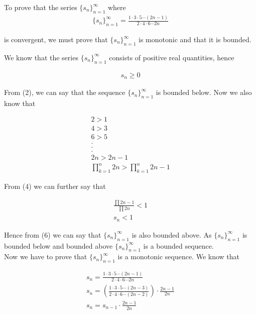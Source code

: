 \documentclass[11pt, letterpaper]{article}
\begin{document}
\begin{enumerate}
{	To prove that the series $ \lbrace s_n \rbrace_{n=1}^\infty $ where\\
	\begin{eqnarray}
		\lbrace s_n \rbrace_{n=1}^\infty  = \frac{1 \cdot 3 \cdot 5 \cdots (2n-1)}{2 \cdot 4 \cdot 6 \cdots 2n}
	\end{eqnarray} 
	
	is convergent, we must prove that $ \lbrace s_n \rbrace_{n=1}^\infty $ is monotonic and that it is bounded.
	
	We know that the series $ \lbrace s_n \rbrace_{n=1}^\infty $ consists of positive real quantities, hence
	
	\begin{eqnarray}
		s_n \geq 0
	\end{eqnarray}
	
	From (2), we can say that the sequence $ \lbrace s_n \rbrace_{n=1}^\infty $ is bounded below. Now we also know that 
	
	\begin{eqnarray}
		2 > 1 \nonumber \\
		4 > 3 \nonumber \\
		6 > 5 \nonumber \\
		. \nonumber \\
		. \nonumber \\
		. \nonumber \\
		2n > 2n - 1 \\
		\prod_{k=1}^n 2n > \prod_{k=1}^n 2n-1
	\end{eqnarray}
	
	\begin{center}
		From (4) we can further say that
	\end{center}
	
	\begin{eqnarray}
		\displaystyle {\frac{\prod 2n-1}{\prod 2n} }< 1 \\
		s_n < 1
	\end{eqnarray}
	
	Hence from (6) we can say that $ \lbrace s_n \rbrace_{n=1}^\infty $ is also bounded above. As $ \lbrace s_n \rbrace_{n=1}^\infty $ is bounded below and bounded above $ \lbrace s_n \rbrace_{n=1}^\infty $ is a bounded sequence.\\
	
	Now we have to prove that $ \lbrace s_n \rbrace_{n=1}^\infty $ is a monotonic sequence. We know that
	
	\begin{eqnarray}
		s_n = \frac{1 \cdot 3 \cdot 5 \cdots (2n-1)}{2 \cdot 4 \cdot 6 \cdots 2n} \\
		s_n = \left( \frac{1 \cdot 3 \cdot 5 \cdots (2n-3)}{2 \cdot 4\cdot 6 \cdots (2n-2)} \right) \cdot \frac{2n-1}{2n} \\
		s_n = s_{n-1} \cdot \frac{2n-1}{2n}
	\end{eqnarray}
	
}
\end{enumerate}
\end{document}
